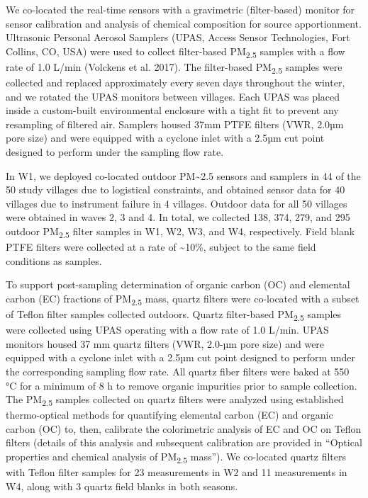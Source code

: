 \documentclass[
  letterpaper,
  DIV=11,
  numbers=noendperiod]{scrartcl}
\begin{document}
We  co-located the real-time sensors with a gravimetric
(filter-based) monitor for sensor calibration and analysis of chemical
composition for source apportionment. Ultrasonic Personal Aerosol
Samplers (UPAS, Access Sensor Technologies, Fort Collins, CO, USA) were
used to collect filter-based PM\textsubscript{2.5} samples with a flow
rate of 1.0 L/min (Volckens et al. 2017). The filter-based
PM\textsubscript{2.5} samples were collected and replaced approximately
every seven days throughout the winter, and we rotated the UPAS monitors
between villages. Each UPAS was placed inside a custom-built
environmental enclosure with a tight fit to prevent any resampling of
filtered air. Samplers housed 37mm PTFE filters (VWR, 2.0µm pore size)
and were equipped with a cyclone inlet with a 2.5µm cut point designed
to perform under the sampling flow rate.

In W1, we deployed co-located outdoor PM\textasciitilde2.5 sensors and
samplers in 44 of the 50 study villages due to logistical constraints,
and obtained sensor data for 40 villages due to instrument failure in 4
villages. Outdoor data for all 50 villages were obtained in waves 2, 3
and 4. In total, we collected 138, 374, 279, and 295 outdoor
PM\textsubscript{2.5} filter samples in W1, W2, W3, and W4,
respectively. Field blank PTFE filters were collected at a rate of
\textasciitilde10\%, subject to the same field conditions as samples.

To support post-sampling determination of organic carbon (OC) and
elemental carbon (EC) fractions of PM\textsubscript{2.5} mass, quartz
filters were co-located with a subset of Teflon filter samples collected
outdoors. Quartz filter-based PM\textsubscript{2.5} samples were
collected using UPAS operating with a flow rate of 1.0 L/min. UPAS
monitors housed 37 mm quartz filters (VWR, 2.0-µm pore size) and were
equipped with a cyclone inlet with a 2.5µm cut point designed to perform
under the corresponding sampling flow rate. All quartz fiber filters
were baked at 550 °C for a minimum of 8 h to remove organic impurities
prior to sample collection. The PM\textsubscript{2.5} samples collected
on quartz filters were analyzed using established thermo-optical methods
for quantifying elemental carbon (EC) and organic carbon (OC) to, then,
calibrate the colorimetric analysis of EC and OC on Teflon filters
(details of this analysis and subsequent calibration are provided in
``Optical properties and chemical analysis of PM\textsubscript{2.5}
mass''). We co-located quartz filters with Teflon filter samples for 23
measurements in W2 and 11 measurements in W4, along with 3 quartz field
blanks in both seasons.
\end{document}
